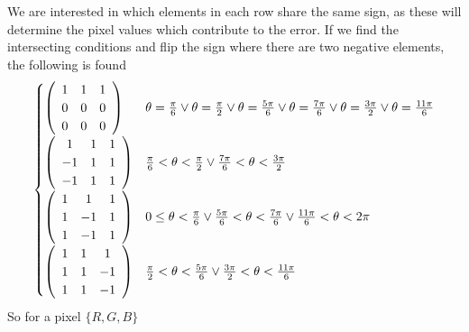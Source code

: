 We are interested in which elements in each row share the same sign, as these will determine the pixel values which contribute to the error. If we find the intersecting conditions and flip the sign where there are two negative elements, the following is found
\begin{equation}
\begin{cases}
 \left(
\begin{array}{ccc}
 1 & 1 & 1 \\
 0 & 0 & 0 \\
 0 & 0 & 0 \\
\end{array}
\right) & \theta =\frac{\pi}{6}\lor \theta =\frac{\pi }{2}\lor \theta =\frac{5 \pi }{6}\lor \theta =\frac{7 \pi }{6}\lor \theta =\frac{3 \pi }{2}\lor \theta =\frac{11 \pi }{6} \\
 \left(
\begin{array}{ccc}
 1 & 1 & 1 \\
 -1 & 1 & 1 \\
 -1 & 1 & 1 \\
\end{array}
\right) & \frac{\pi}{6}<\theta <\frac{\pi }{2}\lor \frac{7 \pi }{6}<\theta <\frac{3 \pi }{2} \\
 \left(
\begin{array}{ccc}
 1 & 1 & 1 \\
 1 & -1 & 1 \\
 1 & -1 & 1 \\
\end{array}
\right) & 0\leq \theta <\frac{\pi}{6}\lor \frac{5 \pi }{6}<\theta <\frac{7 \pi }{6}\lor \frac{11 \pi }{6}<\theta <2 \pi  \\
 \left(
\begin{array}{ccc}
 1 & 1 & 1 \\
 1 & 1 & -1 \\
 1 & 1 & -1 \\
\end{array}
\right) & \frac{\pi }{2}<\theta <\frac{5 \pi }{6}\lor \frac{3 \pi }{2}<\theta <\frac{11 \pi }{6} \\
\end{cases}
\end{equation}
So for a pixel $\{R,G,B\}$  %
